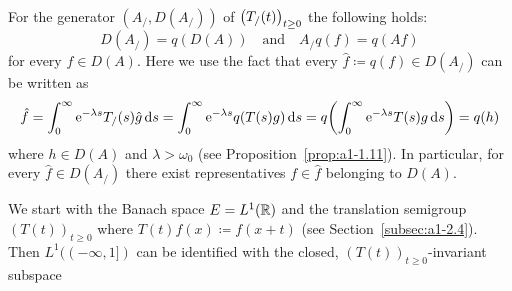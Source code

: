 For the generator $(A_{/}, D(A_{/}))$ of $\mleft(T_{/}(t)\mright)_{t \geq 0}$ the following holds:
\[
    D(A_{/}) = q(D(A)) 
    \quad \text{and} \quad 
    A_{/}q(f) = q(Af)
\]
for every $f \in D(A)$.
Here we use the fact that every $\hat{f} \coloneq q(f) \in D(A_{/})$ can be written as
\[
    \hat{f} = \int_{0}^{\infty} \eu^{-\lambda s} T_{/}(s)\hat{g} \ds 
            = \int_{0}^{\infty} \eu^{-\lambda s} q(T(s)g) \ds 
            = q\mleft(\int_{0}^{\infty} \eu^{-\lambda s} T(s)g \ds\mright) 
            = q(h)
\]
where $h \in D(A)$ and $\lambda > \omega_{0}$ (see Proposition~\ref{prop:a1-1.11}).
In particular, for every $\hat{f} \in D(A_{/})$ there exist representatives $f \in \hat{f}$ belonging to $D(A)$.
\begin{example*}\label{ex:a1-3.1}%
%
%
%
We start with the Banach space $E = L^{1}(\mathbb{R})$ and the translation semigroup $(T(t))_{t \geq 0}$ where $T(t)f(x) \coloneq f(x+t)$ (see Section~\ref{subsec:a1-2.4}).
Then $L^{1}((-\infty,1])$ can be identified with the closed, 
$(T(t))_{t \geq 0}$-invariant subspace
\[
\]
\end{example*}

